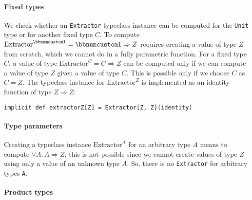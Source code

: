 \paragraph{Fixed types}

We check whether an \lstinline!Extractor! typeclass instance can
be computed for the \lstinline!Unit! type or for another fixed type
$C$. To compute $\text{Extractor}^{\bbnum 1}=\bbnum 1\Rightarrow Z$
requires creating a value of type $Z$ from scratch, which we cannot
do in a fully parametric function. For a fixed type $C$, a value
of type $\text{Extractor}^{C}=C\Rightarrow Z$ can be computed only
if we can compute a value of type $Z$ given a value of type $C$.
This is possible only if we choose $C$ as $C=Z$. The typeclass instance
for $\text{Extractor}^{Z}$ is implemented as an identity function
of type $Z\Rightarrow Z$:
\begin{lstlisting}
implicit def extractorZ[Z] = Extractor[Z, Z](identity)
\end{lstlisting}


\paragraph{Type parameters}

Creating a typeclass instance $\text{Extractor}^{A}$ for an arbitrary
type $A$ means to compute $\forall A.\,A\Rightarrow Z$; this is
not possible since we cannot create values of type $Z$ using only
a value of an unknown type $A$. So, there is no \lstinline!Extractor!
for arbitrary types \lstinline!A!.

\paragraph{Product types}

